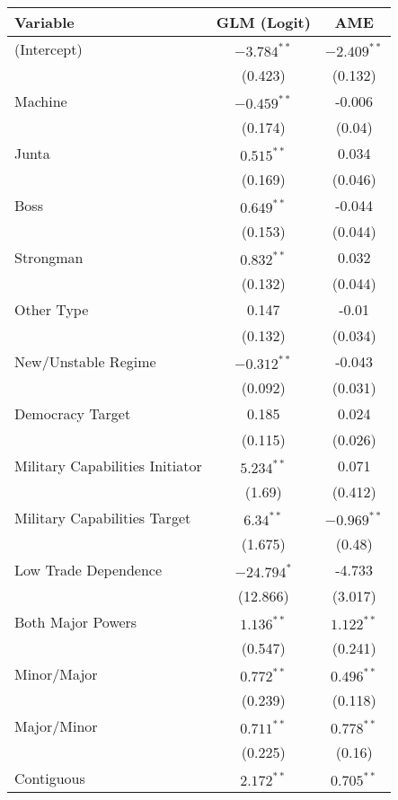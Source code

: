 \begin{table}[ht]
\centering
\begingroup\scriptsize
\begin{tabular}{lcc}
 Variable & GLM (Logit) & AME \\ 
  \hline
\hline
(Intercept) & $-3.784^{\ast\ast}$ & $-2.409^{\ast\ast}$ \\ 
   & (0.423) & (0.132) \\ 
  Machine & $-0.459^{\ast\ast}$ & -0.006 \\ 
   & (0.174) & (0.04) \\ 
  Junta & $0.515^{\ast\ast}$ & 0.034 \\ 
   & (0.169) & (0.046) \\ 
  Boss & $0.649^{\ast\ast}$ & -0.044 \\ 
   & (0.153) & (0.044) \\ 
  Strongman & $0.832^{\ast\ast}$ & 0.032 \\ 
   & (0.132) & (0.044) \\ 
  Other Type & 0.147 & -0.01 \\ 
   & (0.132) & (0.034) \\ 
  New/Unstable Regime & $-0.312^{\ast\ast}$ & -0.043 \\ 
   & (0.092) & (0.031) \\ 
  Democracy Target & 0.185 & 0.024 \\ 
   & (0.115) & (0.026) \\ 
  Military Capabilities Initiator & $5.234^{\ast\ast}$ & 0.071 \\ 
   & (1.69) & (0.412) \\ 
  Military Capabilities Target  & $6.34^{\ast\ast}$ & $-0.969^{\ast\ast}$ \\ 
   & (1.675) & (0.48) \\ 
  Low Trade Dependence  & $-24.794^{\ast}$ & -4.733 \\ 
   & (12.866) & (3.017) \\ 
  Both Major Powers & $1.136^{\ast\ast}$ & $1.122^{\ast\ast}$ \\ 
   & (0.547) & (0.241) \\ 
  Minor/Major & $0.772^{\ast\ast}$ & $0.496^{\ast\ast}$ \\ 
   & (0.239) & (0.118) \\ 
  Major/Minor & $0.711^{\ast\ast}$ & $0.778^{\ast\ast}$ \\ 
   & (0.225) & (0.16) \\ 
  Contiguous & $2.172^{\ast\ast}$ & $0.705^{\ast\ast}$ \\ 

\end{tabular}
\end{table}
